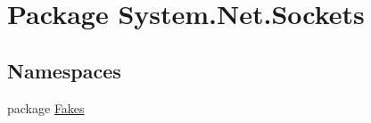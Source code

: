 \hypertarget{namespace_system_1_1_net_1_1_sockets}{\section{Package System.\-Net.\-Sockets}
\label{namespace_system_1_1_net_1_1_sockets}
}
\subsection*{Namespaces}
\begin{DoxyCompactItemize}
\item 
package \hyperlink{namespace_system_1_1_net_1_1_sockets_1_1_fakes}{Fakes}
\end{DoxyCompactItemize}
